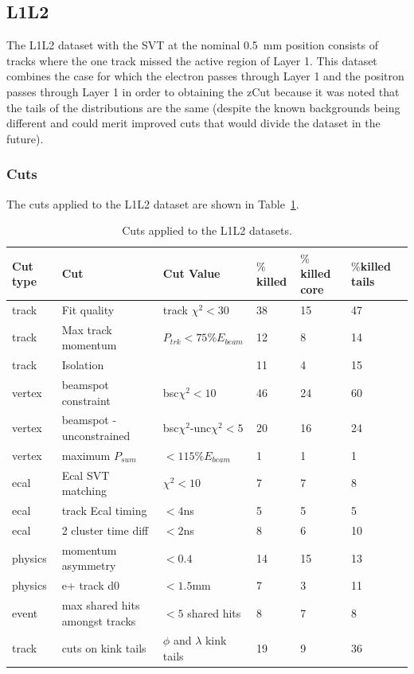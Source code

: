 \subsection{L1L2}

The L1L2 dataset with the SVT at the nominal 0.5~mm position consists of tracks where the one track missed the active region of Layer 1. This dataset combines the case for which the electron passes through Layer 1 and the positron passes through Layer 1 in order to obtaining the zCut because it was noted that the tails of the distributions are the same (despite the known backgrounds being different and could merit improved cuts that would divide the dataset in the future). 

\subsubsection{Cuts}

The cuts applied to the L1L2 dataset are shown in Table~\ref{l1l2_cuts}. 

\begin{table}[H]
\caption{Cuts applied to the L1L2 datasets.}
\label{l1l2_cuts}
\centering
\begin{tabular}{lllllll}
\toprule
Cut type & Cut & Cut Value &  $\%$killed &  $\%$killed core & $\%$killed tails\\
\midrule
track & Fit quality & track $\chi^{2}<30$ & 38 & 15 & 47 \\
track & Max track momentum &  $P_{trk}<75\%E_{beam}$ & 12 & 8 & 14 \\
track & Isolation &   & 11 & 4 & 15 \\
vertex & beamspot constraint & bsc$\chi^{2}<10$  & 46 & 24 & 60 \\
vertex & beamspot - unconstrained & bsc$\chi^{2}$-unc$\chi^2<5$  & 20 & 16 & 24 \\
vertex & maximum $P_{sum}$ &  $<115\%E_{beam}$ & 1 & 1 & 1 \\
ecal & Ecal SVT matching & $\chi^2<10$  & 7 & 7 & 8 \\
ecal & track Ecal timing & $<4$ns  & 5 & 5 & 5 \\
ecal & 2 cluster time diff & $<2$ns  & 8 & 6 & 10 \\
physics & momentum asymmetry & $<0.4$  & 14 & 15 & 13 \\
physics & e+ track d0 & $<1.5$mm  & 7 & 3 & 11 \\
event & max shared hits amongst tracks & $<5$ shared hits  & 8 & 7 & 8 \\
track & cuts on kink tails & $\phi$ and $\lambda$ kink tails & 19 & 9 & 36 \\
\bottomrule
\end{tabular}
\end{table}

